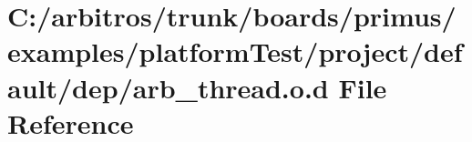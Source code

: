 \hypertarget{platform_test_2project_2default_2dep_2arb__thread_8o_8d}{\section{C\-:/arbitros/trunk/boards/primus/examples/platform\-Test/project/default/dep/arb\-\_\-thread.o.\-d File Reference}
\label{platform_test_2project_2default_2dep_2arb__thread_8o_8d}
}
